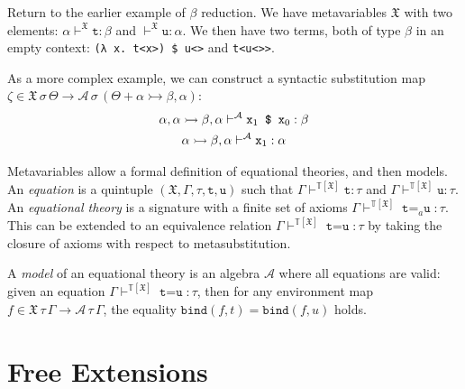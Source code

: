 \documentclass[11pt,a4paper]{article}
\newcommand*\tarr[2]{\ensuremath{{#1} \rightarrowtail {#2}}}
\newcommand*\ctxext[2]{{#1} + {#2}}
\newcommand*\ctxcons[2]{{#1}, {#2}}
\newcommand*\InFamily[4]{\ensuremath{{#2} \vdash^{#1} {#3} : {#4}}}
\newcommand*\Litt[1]{\texttt{#1}}
\newcommand*\Var[1]{\Litt{x}_{#1}}
\newcommand*\Lapp[2]{\texttt{\ensuremath{#1} \$ \ensuremath{#2}}}
\newcommand*\term[1]{\ensuremath{\mathbb{T}{[{#1}]}}}
\begin{document}
Return to the earlier example of \(\beta\) reduction. We have metavariables \(\mathfrak{X}\)
with two elements: \InFamily{\mathfrak{X}}{\alpha}{\Litt{t}}{\beta} and \InFamily{\mathfrak{X}}{}{\Litt{u}}{\alpha}.
We then have two terms, both of type \(\beta\) in an empty context:
\verb|(λ x. t<x>) $ u<>| and \verb|t<u<>>|.

As a more complex example, we can construct a syntactic substitution map \(\zeta \in
{{\mathfrak{X}\,\sigma\,\Theta} \to {\mathcal{A}\,\sigma\,(\ctxext{\Theta}{\ctxcons{\tarr{\alpha}{\beta}}{\alpha}})}}\)\footnotemark{}:
\begin{gather*}
  \InFamily{\mathcal{A}}{\ctxcons{\alpha}{\ctxcons{\tarr{\alpha}{\beta}}{\alpha}}}{\Lapp{\Var{1}}{\Var{0}}}{\beta} \\
  \InFamily{\mathcal{A}}{\ctxcons{\tarr{\alpha}{\beta}}{\alpha}}{\Var{1}}{\alpha}
\end{gather*}


Metavariables allow a formal definition of equational theories, and then models.
An \emph{equation} is a quintuple \((\mathfrak{X},\Gamma,\tau,\Litt{t},\Litt{u})\) such that
\InFamily{\term{\mathfrak{X}}}{\Gamma}{\Litt{t}}{\tau} and \InFamily{\term{\mathfrak{X}}}{\Gamma}{\Litt{u}}{\tau}. An
\emph{equational theory} is a signature with a finite set of axioms
\InFamily{\term{\mathfrak{X}}}{\Gamma}{\Litt{t} =_a \Litt{u}}{\tau}. This can be extended to an
equivalence relation \InFamily{\term{\mathfrak{X}}}{\Gamma}{\Litt{t} = \Litt{u}}{\tau} by taking
the closure of axioms with respect to metasubstitution.

A \emph{model} of an equational theory is an algebra \(\mathcal{A}\) where all equations
are valid: given an equation \InFamily{\term{\mathfrak{X}}}{\Gamma}{\Litt{t} = \Litt{u}}{\tau},
then for any environment map \(f \in {\mathfrak{X}\,\tau\,\Gamma}\to{\mathcal{A}\,\tau\,\Gamma}\), the equality
\(\mathtt{bind}(f,t) = \mathtt{bind}(f,u)\) holds.

\section{Free Extensions}


\end{document}
